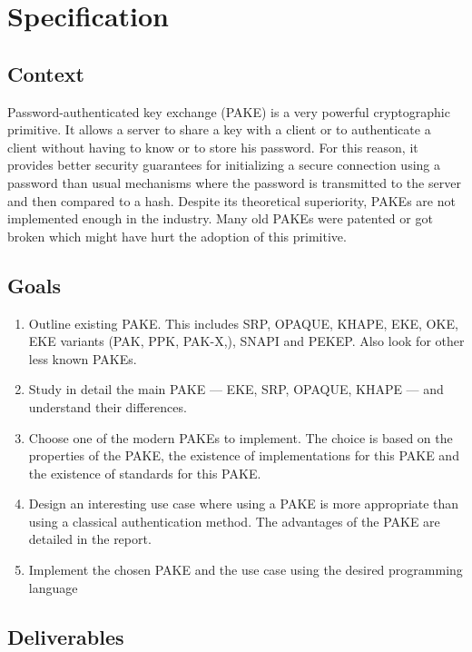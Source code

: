 \documentclass[../report.tex]{subfiles}
\begin{document}
\chapter{Specification}



\section*{Context}

Password-authenticated key exchange (PAKE) is a very powerful cryptographic primitive. It allows a server to share a key with a client or to authenticate a client without having to know or to store his password.
For this reason, it provides better security guarantees for initializing a secure connection using a password than usual mechanisms where the password is transmitted to the server and then compared to a hash.
Despite its theoretical superiority, PAKEs are not implemented enough in the industry. Many old PAKEs were patented or got broken which might have hurt the adoption of this primitive.



\section*{Goals}

\begin{enumerate}
 \item Outline existing PAKE. This includes SRP, OPAQUE, KHAPE, EKE, OKE, EKE variants (PAK, PPK, PAK-X,), SNAPI and PEKEP. Also look for other less known PAKEs.
 \item Study in detail the main PAKE --- EKE, SRP, OPAQUE, KHAPE --- and understand their differences.
 \item Choose one of the modern PAKEs to implement. The choice is based on the properties of the PAKE, the existence of implementations for this PAKE and the existence of standards for this PAKE.
 \item Design an interesting use case where using a PAKE is more appropriate than using a classical authentication method. The advantages of the PAKE are detailed in the report.
 \item Implement the chosen PAKE and the use case using the desired programming language
\end{enumerate}



\section*{Deliverables}
\end{document}
